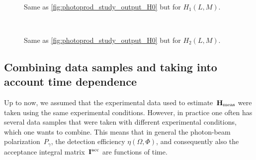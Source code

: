 \begin{figure}[tbp]
  \centering%
  \\%
  \caption{Same as \cref{fig:photoprod_study_output_H0} but for
  $H_1(L, M)$.}%
  \label{fig:photoprod_study_output_H1}%
\end{figure}

\begin{figure}[tbp]
  \centering%
  \\%
  \caption{Same as \cref{fig:photoprod_study_output_H0} but for
  $H_2(L, M)$.}%
  \label{fig:photoprod_study_output_H2}%
\end{figure}


\subsection{Combining data samples and taking into account time dependence}%
\label{sec:photoprod:comb_data}

Up to now, we assumed that the experimental data used to
estimate~$\bm{\mathrm{H}}_\text{meas}$ were taken using the same experimental
conditions.  However, in practice one often has several data samples
that were taken with different experimental conditions, which one
wants to combine.  This means that in general the photon-beam
polarization~$P_\gamma$, the detection efficiency $\eta(\Omega,
\Phi)$, and consequently also the acceptance integral
matrix~$\bm{\mathrm{I}}^\text{acc}$ are functions of time.

